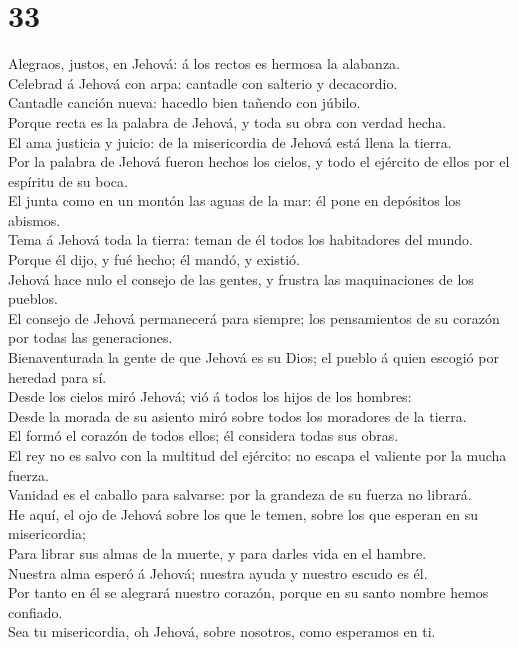 \hypertarget{section-32}{%
\section{33}\label{section-32}}

 Alegraos, justos, en Jehová: á los rectos es hermosa la
alabanza.\\
 Celebrad á Jehová con arpa: cantadle con salterio y
decacordio.\\
 Cantadle canción nueva: hacedlo bien tañendo con júbilo.\\
 Porque recta es la palabra de Jehová, y toda su obra con
verdad hecha.\\
 El ama justicia y juicio: de la misericordia de Jehová está
llena la tierra.\\
 Por la palabra de Jehová fueron hechos los cielos, y todo
el ejército de ellos por el espíritu de su boca.\\
 El junta como en un montón las aguas de la mar: él pone en
depósitos los abismos.\\
 Tema á Jehová toda la tierra: teman de él todos los
habitadores del mundo.\\
 Porque él dijo, y fué hecho; él mandó, y existió.\\
 Jehová hace nulo el consejo de las gentes, y frustra las
maquinaciones de los pueblos.\\
 El consejo de Jehová permanecerá para siempre; los
pensamientos de su corazón por todas las generaciones.\\
 Bienaventurada la gente de que Jehová es su Dios; el
pueblo á quien escogió por heredad para sí.\\
 Desde los cielos miró Jehová; vió á todos los hijos de los
hombres:\\
 Desde la morada de su asiento miró sobre todos los
moradores de la tierra.\\
 El formó el corazón de todos ellos; él considera todas sus
obras.\\
 El rey no es salvo con la multitud del ejército: no escapa
el valiente por la mucha fuerza.\\
 Vanidad es el caballo para salvarse: por la grandeza de su
fuerza no librará.\\
 He aquí, el ojo de Jehová sobre los que le temen, sobre
los que esperan en su misericordia;\\
 Para librar sus almas de la muerte, y para darles vida en
el hambre.\\
 Nuestra alma esperó á Jehová; nuestra ayuda y nuestro
escudo es él.\\
 Por tanto en él se alegrará nuestro corazón, porque en su
santo nombre hemos confiado.\\
 Sea tu misericordia, oh Jehová, sobre nosotros, como
esperamos en ti.

